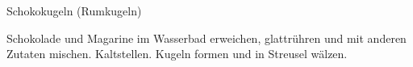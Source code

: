 \begin{recipe}{Schokokugeln (Rumkugeln)}

    \begin{ingredients}
    \end{ingredients}

    \begin{instructions}
        Schokolade und Magarine im Wasserbad erweichen, glattrühren und mit anderen Zutaten mischen.
        Kaltstellen.
        Kugeln formen und in Streusel wälzen.
    \end{instructions}
\end{recipe}
